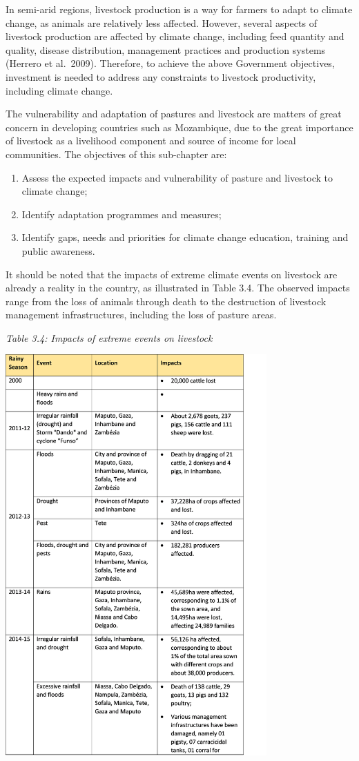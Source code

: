 \documentclass[
]{book}
\begin{document}
In semi-arid regions, livestock production is a way for farmers to adapt to climate change, as animals are relatively less affected. However, several aspects of livestock production are affected by climate change, including feed quantity and quality, disease distribution, management practices and production systems (Herrero et al.~2009). Therefore, to achieve the above Government objectives, investment is needed to address any constraints to livestock productivity, including climate change.

The vulnerability and adaptation of pastures and livestock are matters of great concern in developing countries such as Mozambique, due to the great importance of livestock as a livelihood component and source of income for local communities. The objectives of this sub-chapter are:

\begin{enumerate}
\def\labelenumi{(\arabic{enumi})}
\item
  Assess the expected impacts and vulnerability of pasture and livestock to climate change;
\item
  Identify adaptation programmes and measures;
\item
  Identify gaps, needs and priorities for climate change education, training and public awareness.
\end{enumerate}

It should be noted that the impacts of extreme climate events on livestock are already a reality in the country, as illustrated in Table 3.4. The observed impacts range from the loss of animals through death to the destruction of livestock management infrastructures, including the loss of pasture areas.

\emph{Table 3.4: Impacts of extreme events on livestock}

\includegraphics[width=0.75\textwidth,height=\textheight]{Livestock.png}
\end{document}
